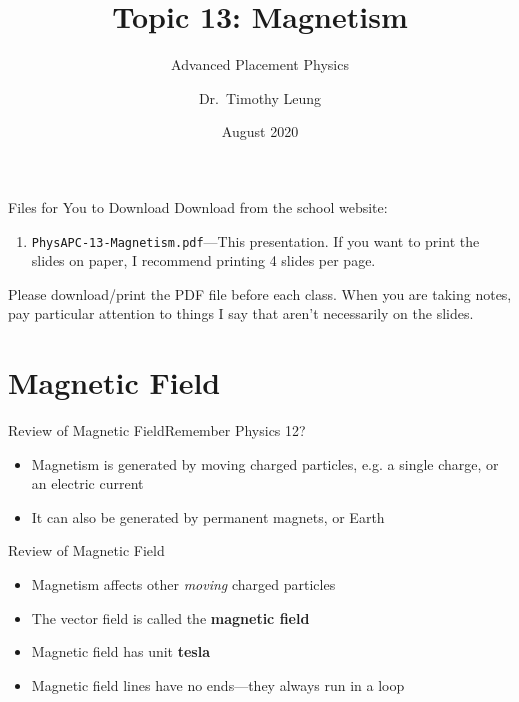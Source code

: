 \documentclass[12pt,aspectratio=169]{beamer}
\title{Topic 13: Magnetism}
\subtitle{Advanced Placement Physics}
\author[TML]{Dr.\ Timothy Leung}
\institute{Olympiads School\\Toronto, ON, Canada}
\date{August 2020}
\begin{document}
\begin{frame}
  \maketitle
\end{frame}



\begin{frame}{Files for You to Download}
  Download from the school website:
  \begin{enumerate}
  \item\texttt{PhysAPC-13-Magnetism.pdf}---This presentation. If you want to
    print the slides on paper, I recommend printing 4 slides per page.
  \end{enumerate}

  \vspace{.2in}Please download/print the PDF file before each class. When you
  are taking notes, pay particular attention to things I say that aren't
  necessarily on the slides.
\end{frame}



\section{Magnetic Field}

\begin{frame}{Review of Magnetic Field}{Remember Physics 12?}
  \begin{itemize}
  \item Magnetism is generated by moving charged particles, e.g.
    a single charge, or an electric current
  \item It can also be generated by permanent magnets, or Earth
  \end{itemize}
\end{frame}



\begin{frame}{Review of Magnetic Field}
  \begin{itemize}
  \item Magnetism affects other \emph{moving} charged particles
  \item The vector field is called the \textbf{magnetic field}
  \item Magnetic field has unit \textbf{tesla}
  \item Magnetic field lines have no ends---they always run in a loop
  \end{itemize}
\end{frame}
\end{document}
